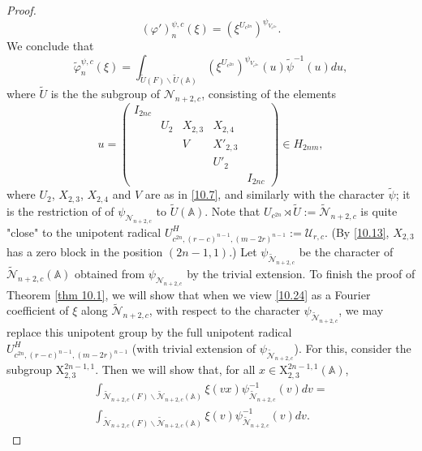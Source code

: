 \documentclass[12pts]{amsart}
\newcommand{\BA}{{\mathbb {A}}}
\begin{document}
\begin{proof}
\begin{equation}\label{10.23}
(\varphi')_n^{\psi,c}(\xi)=(\xi^{U_{c^{2n}}})^{\psi_{V_{c^{2n}}}}.
\end{equation}
We conclude that
\begin{equation}\label{10.24}
 \tilde{\varphi}_n^{\psi,c}(\xi)=\int_{\tilde{U}(F)\backslash \tilde{U}(\BA)}
(\xi^{U_{c^{2n}}})^{\psi_{V_{c^{2n}}}}(u)\tilde{\psi}^{-1}(u)du,
\end{equation}
where $\tilde{U}$ is the  the subgroup of $\mathcal{N}_{n+2,c}$, consisting of the elements
\begin{equation}\label{10.25}
u=\begin{pmatrix}I_{2nc}\\&U_2&X_{2,3}&X_{2,4}\\&&V&X'_{2,3}\\&&&U'_2\\&&&&I_{2nc}\end{pmatrix}\in H_{2nm},
\end{equation}
where $U_2$, $X_{2,3}$, $X_{2,4}$ and $V$ are as in \eqref{10.7}, and similarly with the character $\tilde{\psi}$; it is the restriction of
of $\psi_{\mathcal{N}_{n+2,c}}$ to $\tilde{U}(\BA)$. Note that $U_{c^{2n}}\rtimes \tilde{U}:=\tilde{\mathcal{N}}_{n+2,c}$ is quite "close" to the unipotent radical $U^H_{c^{2n},(r-c)^{n-1},(m-2r)^{n-1}}:=\mathcal{U}_{r,c}$. (By \eqref{10.13}, $X_{2,3}$ has a zero block in the position $(2n-1,1)$.) Let  $\psi_{\tilde{\mathcal{N}}_{n+2,c}}$ be the character of $\tilde{\mathcal{N}}_{n+2,c}(\BA)$ obtained from $\psi_{\mathcal{N}_{n+2,c}}$ by the trivial extension. To finish the proof of Theorem \ref{thm 10.1}, we will show that when we view \eqref{10.24} as a Fourier coefficient of $\xi$ along $\tilde{\mathcal{N}}_{n+2,c}$, with respect to the character $\psi_{\tilde{\mathcal{N}}_{n+2,c}}$, we may replace this unipotent group by the full unipotent radical $U^H_{c^{2n},(r-c)^{n-1},(m-2r)^{n-1}}$ (with trivial extension of $\psi_{\tilde{\mathcal{N}}_{n+2,c}}$). For this, consider the subgroup $\mathrm{X}_{2,3}^{2n-1,1}$. Then we will show that, for all $x\in \mathrm{X}_{2,3}^{2n-1,1}(\BA)$,
\begin{multline}\label{10.26}
\int_{\tilde{\mathcal{N}}_{n+2,c}(F)\backslash \tilde{\mathcal{N}}_{n+2,c}(\BA)}\xi(vx)\psi^{-1}_{\tilde{\mathcal{N}}_{n+2,c}}(v)dv=\\
\int_{\tilde{\mathcal{N}}_{n+2,c}(F)\backslash \tilde{\mathcal{N}}_{n+2,c}(\BA)}\xi(v)\psi^{-1}_{\tilde{\mathcal{N}}_{n+2,c}}(v)dv.
\end{multline}

\end{proof}
\end{document}
